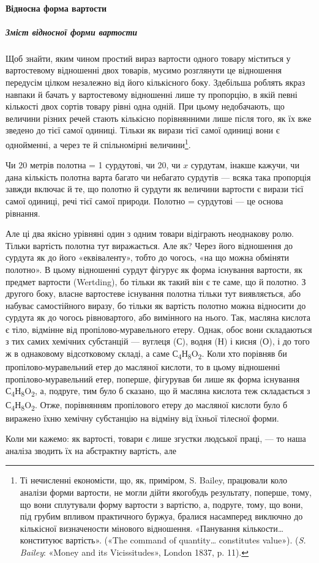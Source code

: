 \paragraph{Відносна форма вартости}

\subparagraph{Зміст відносної форми вартости}

Щоб знайти, яким чином простий вираз вартости одного товару
міститься у вартостевому відношенні двох товарів, мусимо
розглянути це відношення передусім цілком незалежно від його
кількісного боку. Здебільша роблять якраз навпаки й бачать у
вартостевому відношенні лише ту пропорцію, в якій певні кількості
двох сортів товару рівні одна одній. При цьому недобачають,
що величини різних речей стають кількісно порівнянними
лише після того, як їх вже зведено до тієї самої одиниці. Тільки
як вирази тієї самої одиниці вони є однойменні, а через те й спільномірні
величини\footnote{
Ті нечисленні економісти, що, як, приміром, S. Bailey, працювали
коло аналізи форми вартости, не могли дійти якогобудь результату,
поперше, тому, що вони сплутували форму вартости з вартістю, а, подруге,
тому, що вони, під грубим впливом практичного буржуа, бралися насамперед
виключно до кількісної визначености мінового відношення. «Панування
кількости\dots{} конституює вартість». («The command of quantity\dots{}
constitutes value»). (\emph{S. Bailey}: «Money and its Vicissitudes», London
1837, p. 11).
}.

Чи 20 метрів полотна = 1 сурдутові, чи 20, чи $x$ сурдутам,
інакше кажучи, чи дана кількість полотна варта багато чи небагато
сурдутів — всяка така пропорція завжди включає й те, що
полотно й сурдути як величини вартости є вирази тієї самої одиниці,
речі тієї самої природи. Полотно = сурдутові — це основа
рівнання.

Але ці два якісно урівняні один з одним товари відіграють
неоднакову ролю. Тільки вартість полотна тут виражається. Але
як? Через його відношення до сурдута як до його «еквіваленту»,
тобто до чогось, «на що можна обміняти полотно». В цьому відношенні
сурдут фігурує як форма існування вартости, як предмет
вартости (Wertding), бо тільки як такий він є те саме, що й полотно.
З другого боку, власне вартостеве існування полотна
тільки тут виявляється, або набуває самостійного виразу, бо
тільки як вартість полотно можна відносити до сурдута як до
чогось рівновартого, або вимінного на нього. Так, масляна кислота
є тіло, відмінне від пропілово-муравельного етеру. Однак, обоє
вони складаються з тих самих хемічних субстанцій — вуглеця
(С), водня (Н) і кисня (О), і до того ж в однаковому відсотковому
складі, а саме С\textsubscript{4}Н\textsubscript{8}O\textsubscript{2}.
Коли хто порівняв би пропілово-муравельний
етер до масляної кислоти, то в цьому відношенні пропілово-муравельний
етер, поперше, фігурував би лише як форма
існування С\textsubscript{4}Н\textsubscript{8}O\textsubscript{2},
а, подруге, тим було б сказано, що й масляна
кислота теж складається з С\textsubscript{4}Н\textsubscript{8}O\textsubscript{2}.
Отже, порівнянням пропілового
етеру до масляної кислоти було б виражено їхню хемічну
субстанцію на відміну від їхньої тілесної форми.

Коли ми кажемо: як вартості, товари є лише згустки людської
праці, — то наша аналіза зводить їх на абстрактну вартість, але
\parbreak{}  %
